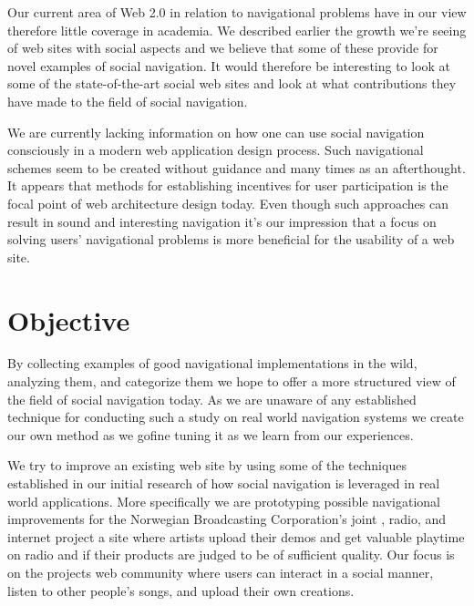 Our current area of Web 2.0 in relation to navigational problems have in our
view therefore little coverage in academia.
We described earlier the growth we're seeing of web sites with social
aspects and we believe that some of these provide for novel examples of social
navigation. It would therefore be interesting to look at some of the
state-of-the-art social web sites and look at what contributions they have
made to the field of social navigation.

We are currently lacking information on how one can use social navigation
consciously in a modern web application design process. Such navigational
schemes seem to be created without guidance and many times as an afterthought.
It appears that methods for establishing incentives for user participation
is the focal point of web architecture design today. Even though such
approaches can result in sound and interesting navigation it's our impression
that a focus on solving users' navigational problems is more beneficial for
the usability of a web site.

\section{Objective}

By collecting examples of good navigational implementations in the wild,
analyzing them, and categorize them we hope to offer a more structured
view of the field of social navigation today.
As we are unaware of any established technique for
conducting such a study on real world navigation systems we create our own
method as we go\dash{}fine tuning it as we learn from our experiences.

We try to improve an existing web site by using some of the techniques
established in our initial research of how social navigation is leveraged
in real world applications. More specifically we are prototyping possible
navigational improvements for the Norwegian Broadcasting Corporation's joint
, radio, and internet project \project{\urort{}}\dash{}a site where
artists upload their demos and get valuable playtime on radio and  if
their products are judged to be of sufficient quality. Our focus is on the
projects web community%
where users can interact in a social manner, listen to other people's songs,
and upload their own creations.

